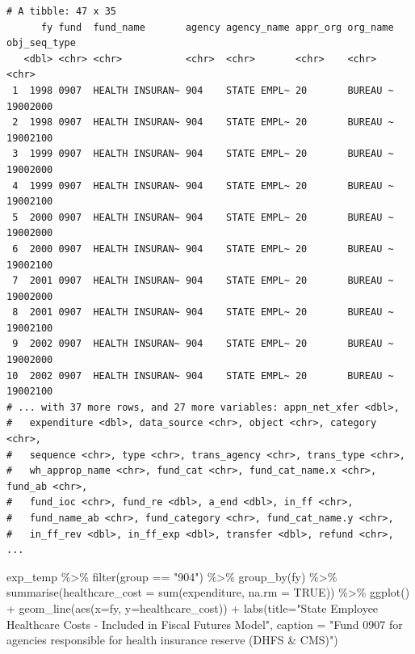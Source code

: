 \documentclass[
  letterpaper,
  DIV=11,
  numbers=noendperiod]{scrreport}
\newenvironment{Shaded}{\begin{snugshade}}{\end{snugshade}}
\newcommand{\AttributeTok}[1]{\textcolor[rgb]{0.40,0.45,0.13}{#1}}
\newcommand{\ConstantTok}[1]{\textcolor[rgb]{0.56,0.35,0.01}{#1}}
\newcommand{\FunctionTok}[1]{\textcolor[rgb]{0.28,0.35,0.67}{#1}}
\newcommand{\NormalTok}[1]{\textcolor[rgb]{0.00,0.23,0.31}{#1}}
\newcommand{\SpecialCharTok}[1]{\textcolor[rgb]{0.37,0.37,0.37}{#1}}
\newcommand{\StringTok}[1]{\textcolor[rgb]{0.13,0.47,0.30}{#1}}
\begin{document}
\begin{verbatim}
# A tibble: 47 x 35
      fy fund  fund_name       agency agency_name appr_org org_name obj_seq_type
   <dbl> <chr> <chr>           <chr>  <chr>       <chr>    <chr>    <chr>       
 1  1998 0907  HEALTH INSURAN~ 904    STATE EMPL~ 20       BUREAU ~ 19002000    
 2  1998 0907  HEALTH INSURAN~ 904    STATE EMPL~ 20       BUREAU ~ 19002100    
 3  1999 0907  HEALTH INSURAN~ 904    STATE EMPL~ 20       BUREAU ~ 19002000    
 4  1999 0907  HEALTH INSURAN~ 904    STATE EMPL~ 20       BUREAU ~ 19002100    
 5  2000 0907  HEALTH INSURAN~ 904    STATE EMPL~ 20       BUREAU ~ 19002000    
 6  2000 0907  HEALTH INSURAN~ 904    STATE EMPL~ 20       BUREAU ~ 19002100    
 7  2001 0907  HEALTH INSURAN~ 904    STATE EMPL~ 20       BUREAU ~ 19002000    
 8  2001 0907  HEALTH INSURAN~ 904    STATE EMPL~ 20       BUREAU ~ 19002100    
 9  2002 0907  HEALTH INSURAN~ 904    STATE EMPL~ 20       BUREAU ~ 19002000    
10  2002 0907  HEALTH INSURAN~ 904    STATE EMPL~ 20       BUREAU ~ 19002100    
# ... with 37 more rows, and 27 more variables: appn_net_xfer <dbl>,
#   expenditure <dbl>, data_source <chr>, object <chr>, category <chr>,
#   sequence <chr>, type <chr>, trans_agency <chr>, trans_type <chr>,
#   wh_approp_name <chr>, fund_cat <chr>, fund_cat_name.x <chr>, fund_ab <chr>,
#   fund_ioc <chr>, fund_re <dbl>, a_end <dbl>, in_ff <chr>,
#   fund_name_ab <chr>, fund_category <chr>, fund_cat_name.y <chr>,
#   in_ff_rev <dbl>, in_ff_exp <dbl>, transfer <dbl>, refund <chr>, ...
\end{verbatim}

\begin{Shaded}
\begin{Highlighting}[]
\NormalTok{exp\_temp }\SpecialCharTok{\%\textgreater{}\%} 
  \FunctionTok{filter}\NormalTok{(group }\SpecialCharTok{==} \StringTok{"904"}\NormalTok{) }\SpecialCharTok{\%\textgreater{}\%} 
  \FunctionTok{group\_by}\NormalTok{(fy) }\SpecialCharTok{\%\textgreater{}\%} 
  \FunctionTok{summarise}\NormalTok{(}\AttributeTok{healthcare\_cost =} \FunctionTok{sum}\NormalTok{(expenditure, }\AttributeTok{na.rm =} \ConstantTok{TRUE}\NormalTok{)) }\SpecialCharTok{\%\textgreater{}\%} 
  \FunctionTok{ggplot}\NormalTok{() }\SpecialCharTok{+}
  \FunctionTok{geom\_line}\NormalTok{(}\FunctionTok{aes}\NormalTok{(}\AttributeTok{x=}\NormalTok{fy, }\AttributeTok{y=}\NormalTok{healthcare\_cost)) }\SpecialCharTok{+} 
  \FunctionTok{labs}\NormalTok{(}\AttributeTok{title=}\StringTok{"State Employee Healthcare Costs {-} Included in Fiscal Futures Model"}\NormalTok{, }
       \AttributeTok{caption =} \StringTok{"Fund 0907 for agencies responsible for health insurance reserve (DHFS \& CMS)"}\NormalTok{)}
\end{Highlighting}
\end{Shaded}
\end{document}
